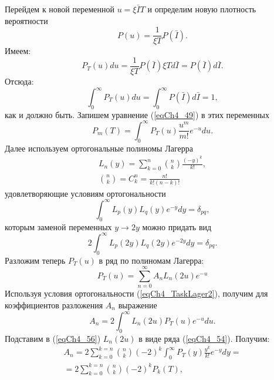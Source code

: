 Перейдем к новой переменной $u = \xi \bar{I} T$ и определим новую
плотность вероятности 
\[
P\left(u\right) = \frac{1}{\xi T} P\left(\bar{I}\right).
\]
Имеем: 
\[
P_T\left(u\right) du = \frac{1}{\xi T} P\left(\bar{I}\right) \xi T d
\bar{I} = P\left(\bar{I}\right) d \bar{I}.
\]
Отсюда: 
\[
\int_0^{\infty}P_T\left(u\right) du = 
\int_0^{\infty}P\left(\bar{I}\right) d\bar{I} = 1, 
\]
как и должно быть. Запишем уравнение (\ref{eqCh4_49}) в этих  
переменных 
\begin{equation}
P_m\left(T\right) = 
\int_0^{\infty}
P_T\left(u\right)
\frac{u^m}{m!} e^{-u} 
d u.
\label{eqCh4_53}
\end{equation}
Далее используем ортогональные полиномы Лагерра
\begin{eqnarray}
L_n\left(y\right) = \sum_{k = 0}^{n}{n\choose k}
\frac{\left(-y\right)^k}{k!},
\nonumber \\
{n\choose k} = C_k^n = \frac{n!}{k!\left(n - k\right)!}
\label{eqCh4_54}
\end{eqnarray}
удовлетворяющие условиям ортогональности 
\begin{equation}
\int_0^{\infty}L_p\left(y\right)L_q\left(y\right)e^{-y} dy =
\delta_{pq},
\label{eqCh4_TaskLager1}
\end{equation}
которым заменой переменных $y \rightarrow 2y$ можно придать вид
\begin{equation}
2 \int_0^{\infty}L_p\left(2 y\right)L_q\left(2 y\right)e^{-2 y} dy =
\delta_{pq}. 
\label{eqCh4_TaskLager2}
\end{equation}
Разложим теперь $P_T\left(u\right)$ в ряд по полиномам Лагерра:
\begin{equation}
P_T\left(u\right) = 
\sum_{n = 0}^{\infty}
A_n L_n\left(2u \right)
e^{-u} 
\label{eqCh4_55}
\end{equation}
Используя условия ортогональности (\ref{eqCh4_TaskLager2}), получим для
коэффициентов разложения $A_n$ выражение  
\begin{equation}
A_n = 2 \int_0^{\infty}
L_n\left(2 u\right)P_T\left(u\right)e^{-u}du.
\label{eqCh4_56}
\end{equation}
Подставим в (\ref{eqCh4_56}) $L_n\left(2 u\right)$ в виде ряда
(\ref{eqCh4_54}). Получим: 
\begin{eqnarray}
A_n = 2 \sum_{k = 0}^{k = n}
{n\choose k}\left(- 2\right)^k\int_0^{\infty}
P_T\left(y\right)\frac{y^k}{k!}e^{-y} dy = 
\nonumber \\
= 2 \sum_{k = 0}^{k = n}
{n\choose k}
\left(- 2\right)^k
P_k\left(T\right),
\label{eqCh4_57}
\end{eqnarray}
